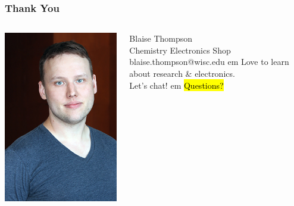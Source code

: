 \documentclass{presentation}
\begin{document}
\begin{frame}\frametitle{Thank You}
  \begin{columns}
    \begin{column}{0.33\textwidth}
      \includegraphics[width=\textwidth]{"./Thompson_Blaise_LowRes.jpg"}
    \end{column}
    \begin{column}{0.67\textwidth}
      Blaise Thompson \\
      Chemistry Electronics Shop \\
      blaise.thompson@wisc.edu
       em
      Love to learn about research \& electronics.\\
      Let's chat!
       em
      \hl{Questions?}
    \end{column}
  \end{columns}
\end{frame}
\end{document}

